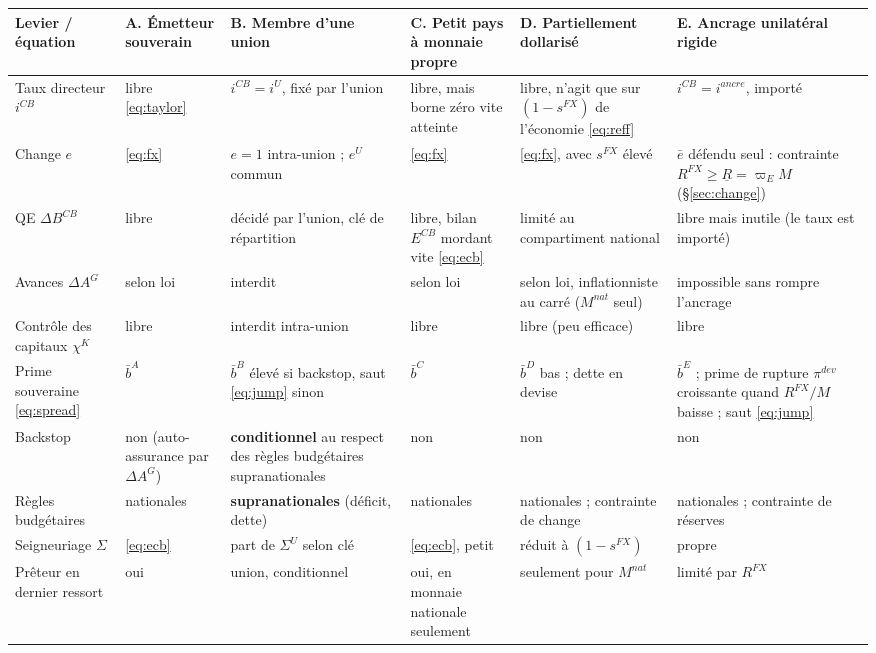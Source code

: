\documentclass[11pt,a4paper]{article}
\begin{document}
\begin{center}\footnotesize
\begin{tabular}{p{2.0cm}p{2.4cm}p{2.6cm}p{2.2cm}p{2.4cm}p{2.5cm}}
\toprule
\textbf{Levier / équation} & \textbf{A. Émetteur souverain} & \textbf{B. Membre d'une union} & \textbf{C. Petit pays à monnaie propre} & \textbf{D. Partiellement dollarisé} & \textbf{E. Ancrage unilatéral rigide}\\
\midrule
Taux directeur $i^{CB}$ & libre \eqref{eq:taylor} & $i^{CB} = i^{U}$, fixé par l'union & libre, mais borne zéro vite atteinte & libre, n'agit que sur $(1-s^{FX})$ de l'économie \eqref{eq:reff} & $i^{CB}=i^{ancre}$, importé\\
Change $e$ & \eqref{eq:fx} & $e=1$ intra-union ; $e^{U}$ commun & \eqref{eq:fx} & \eqref{eq:fx}, avec $s^{FX}$ élevé & $\bar e$ défendu seul : contrainte $R^{FX}\ge\underline R = \varpi_E M$ (\S\ref{sec:change})\\
QE $\Delta B^{CB}$ & libre & décidé par l'union, clé de répartition & libre, bilan $E^{CB}$ mordant vite \eqref{eq:ecb} & limité au compartiment national & libre mais inutile (le taux est importé)\\
Avances $\Delta A^G$ & selon loi & interdit & selon loi & selon loi, inflationniste au carré ($M^{nat}$ seul) & impossible sans rompre l'ancrage\\
Contrôle des capitaux $\chi^K$ & libre & interdit intra-union & libre & libre (peu efficace) & libre\\
Prime souveraine \eqref{eq:spread} & $\bar b^{A}$ & $\bar b^{B}$ élevé si backstop, saut \eqref{eq:jump} sinon & $\bar b^{C}$ & $\bar b^{D}$ bas ; dette en devise & $\bar b^{E}$ ; prime de rupture $\pi^{dev}$ croissante quand $R^{FX}/M$ baisse ; saut \eqref{eq:jump}\\
Backstop & non (auto-assurance par $\Delta A^G$) & \textbf{conditionnel} au respect des règles budgétaires supranationales & non & non & non\\
Règles budgétaires & nationales & \textbf{supranationales} (déficit, dette) & nationales & nationales ; contrainte de change & nationales ; contrainte de réserves\\
Seigneuriage $\Sigma$ & \eqref{eq:ecb} & part de $\Sigma^{U}$ selon clé & \eqref{eq:ecb}, petit & réduit à $(1-s^{FX})$ & propre\\
Prêteur en dernier ressort & oui & union, conditionnel & oui, en monnaie nationale seulement & seulement pour $M^{nat}$ & limité par $R^{FX}$\\
\bottomrule
\end{tabular}
\end{center}
\end{document}

